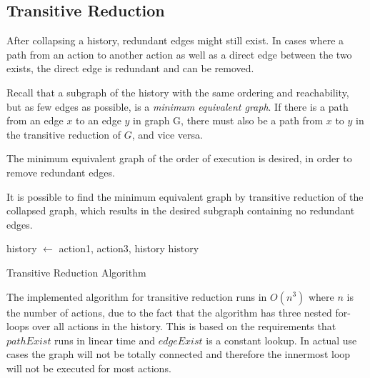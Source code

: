     
	\subsection{Transitive Reduction}
	
	\newpar After collapsing a history, redundant edges might still exist. In cases where a path from an action to another action as well as a direct edge between the two exists, the direct edge is redundant and can be removed. 
	
	\newpar Recall that a subgraph of the history with the same ordering and reachability, but as few edges as possible, is a \textit{minimum equivalent graph}. If there is a path from an edge $x$ to an edge $y$ in graph G, there must also be a path from $x$ to $y$ in the transitive reduction of $G$, and vice versa. 
	
	The minimum equivalent graph of the order of execution is desired, in order to remove redundant edges. 
	
	It is possible to find the minimum equivalent graph by transitive reduction of the collapsed graph, which results in the desired subgraph containing no redundant edges.
	
	\begin{algorithm}
		\begin{algorithmic}
										\State history $\leftarrow$  {action1, action3, history}
									\EndIf
								\EndIf
							\EndFor
						\EndIf
					\EndFor
				\EndFor
			\State
			\Return history
			\EndFunction
		\end{algorithmic}
		\caption{Transitive Reduction Algorithm}
	\end{algorithm}
	
	\newpar The implemented algorithm for transitive reduction runs in $O(n^3)$ where $n$ is the number of actions, due to the fact that the algorithm has three nested for-loops over all actions in the history. This is based on the requirements that $pathExist$ runs in linear time and $edgeExist$ is a constant lookup. In actual use cases the graph will not be totally connected and therefore the innermost loop will not be executed for most actions.
	
